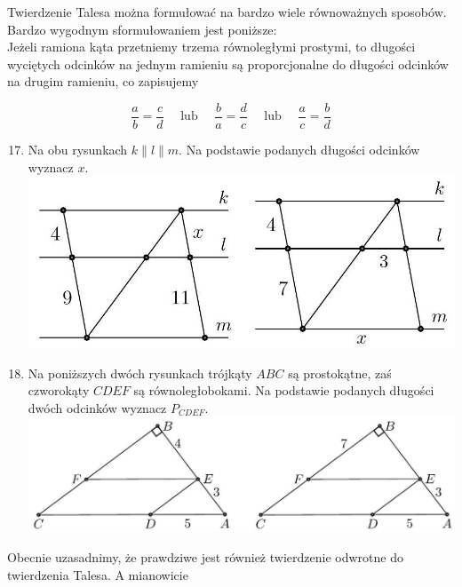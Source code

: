 \documentclass[10pt]{article}
\begin{document}
Twierdzenie Talesa można formułować na bardzo wiele równoważnych sposobów. Bardzo wygodnym sformułowaniem jest poniższe:\\
Jeżeli ramiona kąta przetniemy trzema równoległymi prostymi, to długości wyciętych odcinków na jednym ramieniu są proporcjonalne do długości odcinków na drugim ramieniu, co zapisujemy

\[
\frac{a}{b}=\frac{c}{d} \quad \text { lub } \quad \frac{b}{a}=\frac{d}{c} \quad \text { lub } \quad \frac{a}{c}=\frac{b}{d}
\]

\begin{enumerate}
  \setcounter{enumi}{16}
  \item Na obu rysunkach \(k\|l\| m\). Na podstawie podanych długości odcinków wyznacz \(x\).\\
\includegraphics[max width=\textwidth, center]{2024_11_21_e9b4faa005d5be2cc318g-011(1)}
  \item Na poniższych dwóch rysunkach trójkąty \(A B C\) są prostokątne, zaś czworokąty \(C D E F\) są równoległobokami. Na podstawie podanych długości dwóch odcinków wyznacz \(P_{C D E F}\).\\
\includegraphics[max width=\textwidth, center]{2024_11_21_e9b4faa005d5be2cc318g-012(1)}
\end{enumerate}

Obecnie uzasadnimy, że prawdziwe jest również twierdzenie odwrotne do twierdzenia Talesa. A mianowicie
\end{document}
